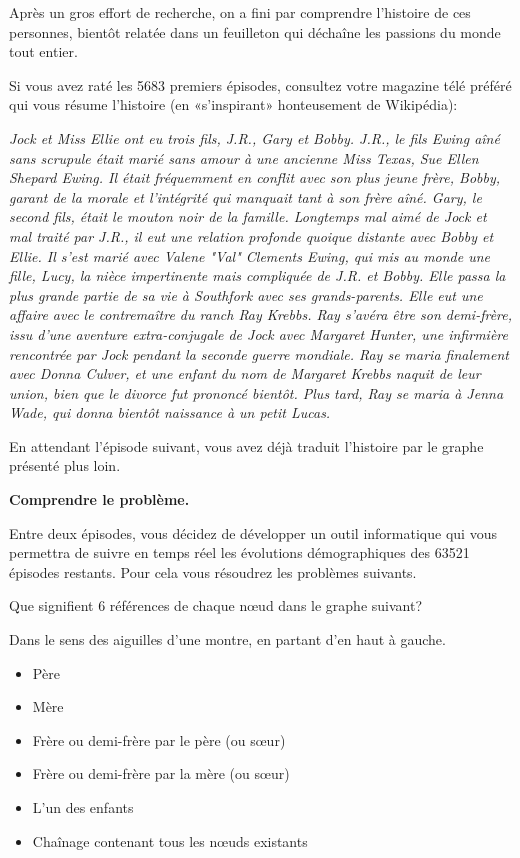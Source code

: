 \documentclass[10pt]{article}\usepackage[correction]{exemptty}
\begin{document}
Après un gros effort de recherche, on a fini par comprendre l'histoire de ces
personnes, bientôt relatée dans un feuilleton qui déchaîne les passions du
monde tout entier.

Si vous avez raté les 5683 premiers épisodes, consultez votre magazine télé
préféré qui vous résume l'histoire (en «s'inspirant» honteusement de Wikipédia):

\emph{Jock et Miss Ellie ont eu trois fils, J.R., Gary et Bobby. J.R., le fils
  Ewing aîné sans scrupule était marié sans amour à une ancienne Miss Texas,
  Sue Ellen Shepard Ewing. Il était fréquemment en conflit avec son plus jeune
  frère, Bobby, garant de la morale et l'intégrité qui manquait tant à son
  frère aîné. Gary, le second fils, était le mouton noir de la
  famille. Longtemps mal aimé de Jock et mal traité par J.R., il eut une
  relation profonde quoique distante avec Bobby et Ellie. Il s'est marié avec
  Valene "Val" Clements Ewing, qui mis au monde une fille, Lucy, la nièce
  impertinente mais compliquée de J.R. et Bobby. Elle passa la plus grande
  partie de sa vie à Southfork avec ses grands-parents. Elle eut une affaire
  avec le contremaître du ranch Ray Krebbs. Ray s'avéra être son demi-frère,
  issu d'une aventure extra-conjugale de Jock avec Margaret Hunter, une
  infirmière rencontrée par Jock pendant la seconde guerre mondiale.  Ray se
  maria finalement avec Donna Culver, et une enfant du nom de Margaret Krebbs
  naquit de leur union, bien que le divorce fut prononcé bientôt. Plus tard,
  Ray se maria à Jenna Wade, qui donna bientôt naissance à un petit Lucas.}

En attendant l'épisode suivant, vous avez déjà traduit l'histoire par
le graphe présenté plus loin.

\Exercice\textbf{Comprendre le problème.}

Entre deux épisodes, vous décidez de développer un outil informatique qui vous
permettra de suivre en temps réel les évolutions démographiques des 63521
épisodes restants. Pour cela vous résoudrez les problèmes suivants.

\Question Que signifient 6 références de chaque nœud dans le graphe suivant?

\begin{Reponse}
  Dans le sens des aiguilles d'une montre, en partant d'en haut à gauche.
  \begin{itemize}
  \item Père
  \item Mère
  \item Frère ou demi-frère par le père (ou sœur)
  \item Frère ou demi-frère par la mère (ou sœur)
  \item L'un des enfants
  \item Chaînage contenant tous les nœuds existants
  \end{itemize}

\end{Reponse}
\end{document}
